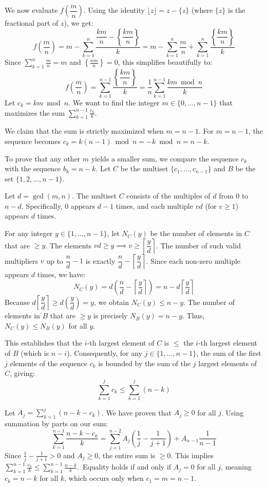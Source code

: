 \begin{enumerate}
 We now evaluate $f\left(\dfrac mn\right)$. Using the identity $\lfloor z \rfloor = z - \{z\}$ (where $\{z\}$ is the fractional part of $z$), we get:
 \[f\left(\dfrac{m}{n}\right) = m - \sum_{k=1}^n \dfrac{\dfrac{km}{n} - \left\{\dfrac{km}{n}\right\}}{k} = m - \sum_{k=1}^n \dfrac{m}{n} + \sum_{k=1}^n \frac{\left\{\dfrac{km}{n}\right\}}{k}\]Since $\sum_{k=1}^n \frac{m}{n} = m$ and $\left\{\frac{nm}{n}\right\} = 0$, this simplifies beautifully to:
 \[f\left(\dfrac{m}{n}\right) = \sum_{k=1}^{n-1} \frac{\left\{\dfrac{km}{n}\right\}}{k} = \frac{1}{n} \sum_{k=1}^{n-1} \frac{km \bmod n}{k}\]Let $c_k = km \bmod n$. We want to find the integer $m \in \{0, \dots, n-1\}$ that maximizes the sum $\sum_{k=1}^{n-1} \frac{c_k}{k}$.

 We claim that the sum is strictly maximized when $m = n-1$. For $m = n-1$, the sequence becomes $c_k = k(n-1) \bmod n = -k \bmod n = n-k$. 

 To prove that any other $m$ yields a smaller sum, we compare the sequence $c_k$ with the sequence $b_k = n-k$. Let $C$ be the multiset $\{c_1, \dots, c_{n-1}\}$ and $B$ be the set $\{1, 2, \dots, n-1\}$. 

 Let $d = \gcd(m, n)$. The multiset $C$ consists of the multiples of $d$ from $0$ to $n-d$. Specifically, $0$ appears $d-1$ times, and each multiple $vd$ (for $v \ge 1$) appears $d$ times. 

 For any integer $y \in \{1, \dots, n-1\}$, let $N_C(y)$ be the number of elements in $C$ that are $\ge y$. The elements $vd \ge y \implies v \ge \left\lceil \dfrac yd \right\rceil$. The number of such valid multipliers $v$ up to $\dfrac{n}{d}-1$ is exactly $\dfrac{n}{d} - \left\lceil \dfrac yd \right\rceil$. Since each non-zero multiple appears $d$ times, we have:
 \[N_C(y) = d \left(\frac{n}{d} - \left\lceil \dfrac yd \right\rceil\right) = n - d\left\lceil \dfrac yd \right\rceil\]Because $d\left\lceil \dfrac yd \right\rceil \ge d\left(\dfrac yd\right) = y$, we obtain $N_C(y) \le n - y$. The number of elements in $B$ that are $\ge y$ is precisely $N_B(y) = n - y$. Thus, $N_C(y) \le N_B(y)$ for all $y$.

 This establishes that the $i$-th largest element of $C$ is $\le$ the $i$-th largest element of $B$ (which is $n-i$). Consequently, for any $j \in \{1, \dots, n-1\}$, the sum of the first $j$ elements of the sequence $c_k$ is bounded by the sum of the $j$ largest elements of $C$, giving:
 \[\sum_{k=1}^j c_k \le \sum_{k=1}^j (n-k)\]

 Let $A_j = \sum_{k=1}^j (n-k - c_k)$. We have proven that $A_j \ge 0$ for all $j$. Using summation by parts on our sum:
 \[\sum_{k=1}^{n-1} \frac{n-k - c_k}{k} = \sum_{j=1}^{n-2} A_j \left(\frac{1}{j} - \frac{1}{j+1}\right) + A_{n-1} \frac{1}{n-1}\]Since $\frac{1}{j} - \frac{1}{j+1} > 0$ and $A_j \ge 0$, the entire sum is $\ge 0$. This implies $\sum_{k=1}^{n-1} \frac{c_k}{k} \le \sum_{k=1}^{n-1} \frac{n-k}{k}$. Equality holds if and only if $A_j = 0$ for all $j$, meaning $c_k = n-k$ for all $k$, which occurs only when $c_1 = m = n-1$.


\end{enumerate}
